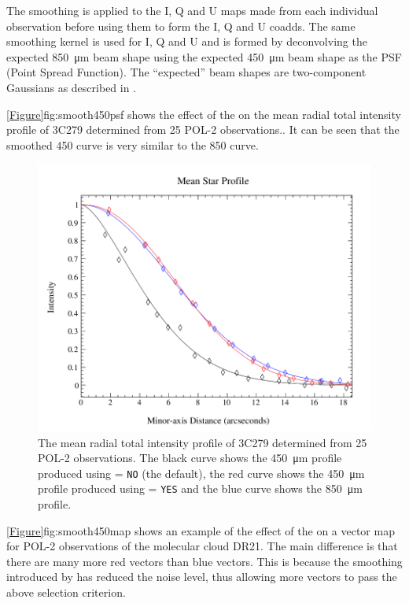 The smoothing is applied to the I, Q and U maps made from each individual observation before using them to form the I, Q and U coadds. The same smoothing kernel is used for I, Q and U and is formed by deconvolving the expected \SI{850}{\micro\metre} beam shape using the expected \SI{450}{\micro\metre} beam shape as the PSF (Point Spread Function). The ``expected'' beam shapes are two-component Gaussians as described in \cite{dempsey12}.

\cref{Figure}{fig:smooth450psf}{} shows the effect of the  on the mean radial total intensity profile of 3C279 determined from 25 POL-2 observations.. It can be seen that the smoothed 450 curve is very similar to the 850 curve.

\begin{figure}[ht!]
\begin{center}
\includegraphics[width=0.9\linewidth]{sc22-smooth450-psf-1.png}
\caption [PSF plot showing the effect of the \poltwomap\  parameter.]{
  The mean radial total intensity profile of 3C279 determined from 25 POL-2 observations. The black curve shows the \SI{450}{\micro\metre} profile produced using  = \texttt{NO} (the default), the red curve shows the \SI{450}{\micro\metre} profile produced using  = \texttt{YES} and the blue curve shows the \SI{850}{\micro\metre} profile.
\label{fig:smooth450psf}
}
\end{center}
\end{figure}

\cref{Figure}{fig:smooth450map}{} shows an example of the effect of the  on a vector map for POL-2 observations of the molecular cloud DR21. The main difference is that there are many more red vectors than blue vectors. This is because the smoothing introduced by  has reduced the noise level, thus allowing more vectors to pass the above selection criterion.

